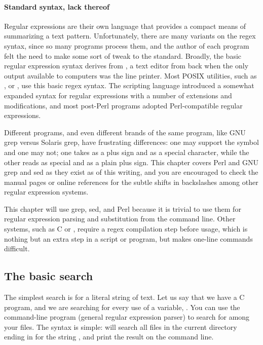 \paragraph{Standard syntax, lack thereof} Regular expressions are
their own language that provides a compact means of summarizing a text
pattern. Unfortunately, there are many variants on the regex syntax,
since so many programs process them, and the author of each program felt
the need to make some sort of tweak to the standard.  Broadly, the basic
regular expression syntax derives from , a text editor from back
when the only output available to computers was the line printer. Most
POSIX utilities, such as ,  or ,
use this basic regex syntax. The scripting language 
introduced a somewhat expanded syntax for regular expressions with
a number of extensions and modifications, and most post-Perl programs
adopted Perl-compatible regular expressions.

Different programs, and even different brands of the same
program, like GNU grep versus Solaris grep, have frustrating
differences: one may support the  symbol and one may not; 
one takes \ci{+} as a plus sign and  \ci{\textbs+} as a special
character, while the other reads \ci{+} as special and \ci{\textbs+}
as a plain plus sign. This chapter covers Perl and GNU grep and sed as they exist as
of this writing, and you are encouraged to check the manual pages or
online references for the subtle shifts in backslashes among other
regular expression systems.


This chapter will use grep, sed, and Perl because it is trivial to
use them for regular expression parsing and substitution from the
command line. Other systems, such as C or , require a regex
compilation step before usage, which is nothing but an extra step in a
script or program, but makes one-line commands difficult.

\subsection{The basic search}
The simplest search is for a literal string of text. Let us say that we
have a C program, and we are searching for every use of a variable,
. You can use the command-line program  (general
regular expression parser) to search for  among your files. The
syntax is simple:  will search all files in the current
directory ending in  for the string , and print the result
on the command line.

